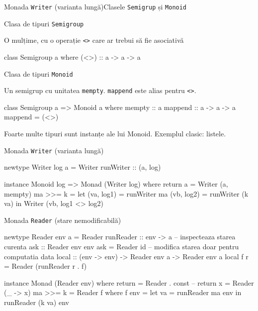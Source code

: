 \documentclass[xcolor=x11names,compress,10pt]{beamer}
\newcommand{\li}[1]{\lstinline$#1$}
\begin{document}
\begin{frame}[fragile]{Monada \li{Writer} (varianta lungă)}{Clasele \li{Semigrup} și \li{Monoid}}


\begin{block}{ Clasa de tipuri \li{Semigroup}}

O mulțime, cu o operație \li{<>} care ar trebui să fie asociativă

\begin{asciihs}
class Semigroup a where
  (<>) :: a -> a -> a
\end{asciihs}
\end{block}


\begin{block}{ Clasa de tipuri \li{Monoid}}

Un semigrup cu unitatea \li{mempty}.  \li{mappend} este alias pentru \li{<>}.

\begin{asciihs}
class Semigroup a => Monoid a where
  mempty :: a
  mappend :: a -> a -> a
  mappend = (<>)
\end{asciihs}
\end{block}

Foarte multe tipuri sunt instanțe ale lui Monoid. Exemplul clasic: listele.
\end{frame}

\begin{frame}[fragile]{Monada \li{Writer} (varianta lungă)}


\begin{asciihs}
newtype Writer log a = Writer { runWriter :: (a, log) }

instance Monoid log => Monad (Writer log) where
  return a = Writer (a, mempty)
  ma >>= k = let (va, log1) = runWriter ma
                 (vb, log2) = runWriter (k va)
              in Writer (vb, log1 <> log2)
\end{asciihs}

\end{frame}


\begin{frame}[fragile]{Monada \li{Reader} (stare nemodificabilă)}


\begin{asciihs}
newtype Reader env a = Reader { runReader :: env -> a }
-- inspecteaza starea curenta
ask :: Reader env env
ask = Reader id
-- modifica starea doar pentru computatia data
local :: (env -> env) -> Reader env a -> Reader env a
local f r = Reader (runReader r . f)
\end{asciihs}

\pause


\begin{asciihs}
instance Monad (Reader env) where
  return = Reader . const  -- return x = Reader (\_ -> x)
  ma >>= k = Reader f
             where 
                f env = let va = runReader ma env
                        in  runReader (k va) env
\end{asciihs}
\end{frame}
\end{document}
